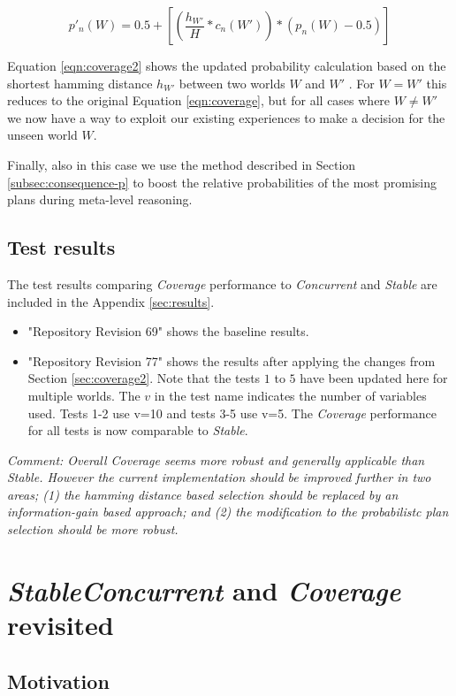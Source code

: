 \documentclass[a4paper]{article}
\newcommand{\cc}{\emph{Concurrent}\xspace}
\newcommand{\st}{\emph{Stable}\xspace}
\newcommand{\cov}{\emph{Coverage}\xspace}
\begin{document}
\begin{equation}
\label{eqn:coverage2}   
p'_n(W)= 0.5 + \left[  \left( \frac{h_{W'}}{H} * c_n(W') \right) *  \left( p_n(W) - 0.5 \right)  \right]
\end{equation}

Equation \ref{eqn:coverage2} shows the updated probability calculation based on the shortest hamming distance $h_{W'}$ between two worlds $W$ and $W'$ . For $W = W'$ this reduces to the original Equation \ref{eqn:coverage}, but for all cases where $W \ne W'$ we now have a way to exploit our existing experiences to make a decision for the unseen world $W$. 

Finally, also in this case we use the method described in Section \ref{subsec:consequence-p} to boost the relative probabilities of the most promising plans during meta-level reasoning.

\subsection{Test results}

The test results comparing \cov performance to \cc and \st are included in the Appendix \ref{sec:results}.
\begin{itemize}
\item "Repository Revision 69" shows the baseline results.
\item "Repository Revision 77" shows the results after applying the changes from Section \ref{sec:coverage2}. Note that the tests $1$ to $5$ have been updated here for multiple worlds. The $v$ in the test name indicates the number of variables used. Tests 1-2 use v=10 and tests 3-5 use v=5. The \cov performance for all tests is now comparable to \st. 
\end{itemize}

\textit{Comment: Overall \cov seems more robust and generally applicable than \st. However the current implementation should be improved further in two areas; (1) the hamming distance based selection should be replaced by an information-gain based approach; and  (2) the modification to the probabilistc plan selection should be more robust.
}

\section{\st \cc and \cov revisited}
\label{sec:coverage3}

\subsection{Motivation}
\label{subsec:coverage3-motivation}
\end{document}
